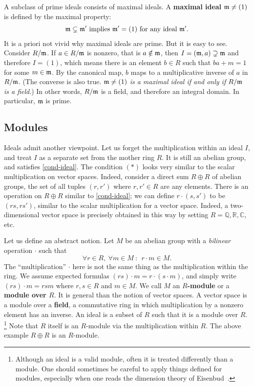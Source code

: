 A subclass of prime ideals consists of maximal ideals.
A {\bf maximal ideal $\mathfrak{m} \neq (1)$} is defined by the maximal property:
\begin{equation}
 \mathfrak{m} \subsetneq \mathfrak{m}' \text{ implies } \mathfrak{m}' = (1) \text{ for any ideal } \mathfrak{m}'.
\end{equation}
It is a priori not vivid why maximal ideals are prime.
But it is easy to see. Consider $R/\mathfrak{m}$. If $a \in R/\mathfrak{m}$ is nonzero, that is $a \notin \mathfrak{m}$, then $I = (\mathfrak{m}, a) \supsetneq \mathfrak{m}$ and therefore $I = (1)$, which means there is an element $b \in R$ such that $b a + m = 1$ for some $m \in \mathfrak{m}$. By the canonical map, $b$ maps to a multiplicative inverse of $a$ in $R/\mathfrak{m}$. 
(The converse is also true. {\em $\mathfrak{m} \neq (1)$ is a maximal ideal if and only if $R/\mathfrak{m}$ is a field}.)
In other words, $R/\mathfrak{m}$ is a field, and therefore an integral domain. In particular, $\mathfrak{m}$ is prime.

\subsection*{Modules}

Ideals admit another viewpoint.
Let us forget the multiplication within an ideal $I$,
and treat $I$ as a separate set from the mother ring $R$.
It is still an abelian group, and satisfies \eqref{cond-ideal}.
The condition $(*)$ looks very similar to the scalar multiplication on vector spaces.
Indeed, consider a direct sum $R \oplus R$ of abelian groups,
the set of all tuples $(r,r')$ where $r,r' \in R$ are any elements.
There is an operation on $R \oplus R$ similar to \eqref{cond-ideal};
we can define $r \cdot (s,s')$ to be $(rs, rs')$,
similar to the scalar multiplication for a vector space.
Indeed, a two-dimensional vector space is precisely obtained in this way by setting $R = \mathbb{Q}, \mathbb{R}, \mathbb{C}$, etc.


Let us define an abstract notion.
Let $M$ be an abelian group with a {\em bilinear} operation $\cdot$ such that
\begin{equation}
 \forall r \in R,~ \forall m \in M~:~~ r \cdot m \in M .
\label{cond-module}
\end{equation}
The ``multiplication'' $\cdot$ here is not the same thing as the multiplication within the ring.
We assume expected formulas $(rs) \cdot m = r \cdot (s \cdot m)$, and simply write $(rs) \cdot m = rsm$ where $r,s \in R$ and $m \in M$.
We call $M$ an {\bf $R$-module} or a {\bf module over $R$}.
It is general than the notion of vector spaces.
A vector space is a module over a {\bf field}, a commutative ring in which multiplication by a nonzero element has an inverse.
An ideal is a subset of $R$ such that it is a module over $R$.%
\footnote{
Although an ideal is a valid module, often it is treated differently than a module.
One should sometimes be careful to apply things defined for modules,
especially when one reads the dimension theory of Eisenbud~\cite{Eisenbud}.}
Note that $R$ itself is an $R$-module via the multiplication within $R$.
The above example $R \oplus R$ is an $R$-module.


